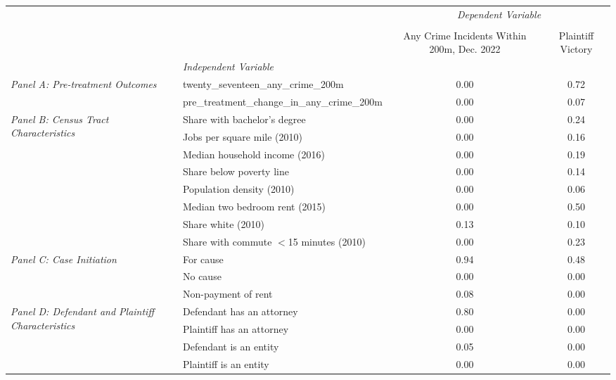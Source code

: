 \begin{tabular}{llcc}
\toprule
 &  & \multicolumn{2}{c}{\textit{Dependent Variable}} \\
\cline{3-4}
\\
 &  & Any Crime Incidents Within 200m, Dec. 2022 & Plaintiff Victory \\
 & \emph{Independent Variable} &  &  \\
\midrule
\multirow[c]{2}{3cm}{\textit{Panel A: Pre-treatment Outcomes}} & twenty_seventeen_any_crime_200m & 0.00 & 0.72 \\
 & pre_treatment_change_in_any_crime_200m & 0.00 & 0.07 \\
\cline{1-4}
\multirow[c]{8}{3cm}{\textit{Panel B: Census Tract Characteristics}} & Share with bachelor's degree & 0.00 & 0.24 \\
 & Jobs per square mile (2010) & 0.00 & 0.16 \\
 & Median household income (2016) & 0.00 & 0.19 \\
 & Share below poverty line & 0.00 & 0.14 \\
 & Population density (2010) & 0.00 & 0.06 \\
 & Median two bedroom rent (2015) & 0.00 & 0.50 \\
 & Share white (2010) & 0.13 & 0.10 \\
 & Share with commute $<$15 minutes (2010) & 0.00 & 0.23 \\
\cline{1-4}
\multirow[c]{3}{3cm}{\textit{Panel C: Case Initiation}} & For cause & 0.94 & 0.48 \\
 & No cause & 0.00 & 0.00 \\
 & Non-payment of rent & 0.08 & 0.00 \\
\cline{1-4}
\multirow[c]{4}{3cm}{\textit{Panel D: Defendant and Plaintiff Characteristics}} & Defendant has an attorney & 0.80 & 0.00 \\
 & Plaintiff has an attorney & 0.00 & 0.00 \\
 & Defendant is an entity & 0.05 & 0.00 \\
 & Plaintiff is an entity & 0.00 & 0.00 \\
\cline{1-4}
\bottomrule
\end{tabular}

